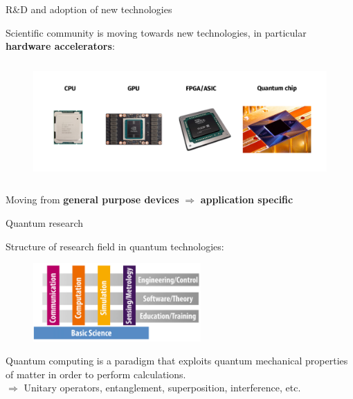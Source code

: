 \documentclass[aspectratio=169, 10pt, xcolor={svgnames}, hyperref={linkcolor=black}]{beamer}
\begin{document}
\begin{frame}{R\&D and adoption of new technologies}

   Scientific community is moving towards new technologies, in particular \textbf{\color{blue}hardware
   accelerators}:

   \vspace{-0.5cm}
   \begin{figure}
     \includegraphics[height=4.5cm]{figures/timeline.png}
   \end{figure}

   \vspace{-1cm}
   \begin{center}
     Moving from \textbf{\color{magenta}general purpose devices} $\Rightarrow$ \textbf{\color{teal}application specific}
   \end{center}

 \end{frame}

 \begin{frame}{Quantum research}

   Structure of research field in {\color{blue}quantum technologies}:
   \begin{figure}
     \includegraphics[height=3cm]{figures/rfqt.png}
   \end{figure}

   {\color{blue}Quantum computing} is a paradigm that exploits quantum mechanical properties of
   matter in order to perform calculations.\\
   $\Rightarrow$ Unitary operators, entanglement, superposition, interference, etc.

 \end{frame}
\end{document}
